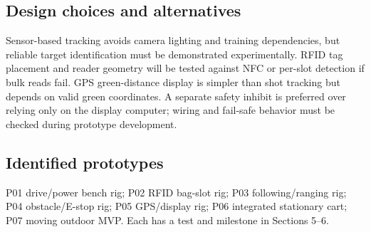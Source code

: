 \subsection{Design choices and alternatives}
Sensor-based tracking avoids camera lighting and training dependencies, but reliable target identification must be demonstrated experimentally. RFID tag placement and reader geometry will be tested against NFC or per-slot detection if bulk reads fail. GPS green-distance display is simpler than shot tracking but depends on valid green coordinates. A separate safety inhibit is preferred over relying only on the display computer; wiring and fail-safe behavior must be checked during prototype development.
\subsection{Identified prototypes}
P01 drive/power bench rig; P02 RFID bag-slot rig; P03 following/ranging rig; P04 obstacle/E-stop rig; P05 GPS/display rig; P06 integrated stationary cart; P07 moving outdoor MVP. Each has a test and milestone in Sections 5--6.\par
